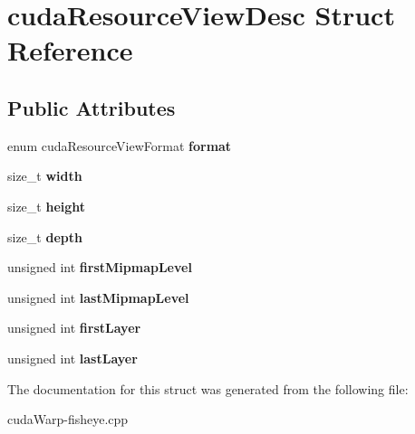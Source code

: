 \hypertarget{structcudaResourceViewDesc}{}\section{cuda\+Resource\+View\+Desc Struct Reference}
\label{structcudaResourceViewDesc}
\subsection*{Public Attributes}
\begin{DoxyCompactItemize}
\item 
enum cuda\+Resource\+View\+Format {\bfseries format}\hypertarget{structcudaResourceViewDesc_a04e9ec20e3b58859dbae8e8e598e1603}{}\label{structcudaResourceViewDesc_a04e9ec20e3b58859dbae8e8e598e1603}

\item 
size\+\_\+t {\bfseries width}\hypertarget{structcudaResourceViewDesc_a914fc3c27ce32c98a1d8d21936642924}{}\label{structcudaResourceViewDesc_a914fc3c27ce32c98a1d8d21936642924}

\item 
size\+\_\+t {\bfseries height}\hypertarget{structcudaResourceViewDesc_af94839eb926fba26fa5ff28775c79d33}{}\label{structcudaResourceViewDesc_af94839eb926fba26fa5ff28775c79d33}

\item 
size\+\_\+t {\bfseries depth}\hypertarget{structcudaResourceViewDesc_a7f76b4084ffdcb7f88e4149b586a990d}{}\label{structcudaResourceViewDesc_a7f76b4084ffdcb7f88e4149b586a990d}

\item 
unsigned int {\bfseries first\+Mipmap\+Level}\hypertarget{structcudaResourceViewDesc_af63fa90d2bf6c66f3865bf13006edded}{}\label{structcudaResourceViewDesc_af63fa90d2bf6c66f3865bf13006edded}

\item 
unsigned int {\bfseries last\+Mipmap\+Level}\hypertarget{structcudaResourceViewDesc_a469d25794fec5471648d0d9e42790431}{}\label{structcudaResourceViewDesc_a469d25794fec5471648d0d9e42790431}

\item 
unsigned int {\bfseries first\+Layer}\hypertarget{structcudaResourceViewDesc_aab0d42bf9dc88944181f697b17e6943a}{}\label{structcudaResourceViewDesc_aab0d42bf9dc88944181f697b17e6943a}

\item 
unsigned int {\bfseries last\+Layer}\hypertarget{structcudaResourceViewDesc_a6d96c5b3df0bce3d945d4ea99666226f}{}\label{structcudaResourceViewDesc_a6d96c5b3df0bce3d945d4ea99666226f}

\end{DoxyCompactItemize}


The documentation for this struct was generated from the following file\+:\begin{DoxyCompactItemize}
\item 
cuda\+Warp-\/fisheye.\+cpp\end{DoxyCompactItemize}
